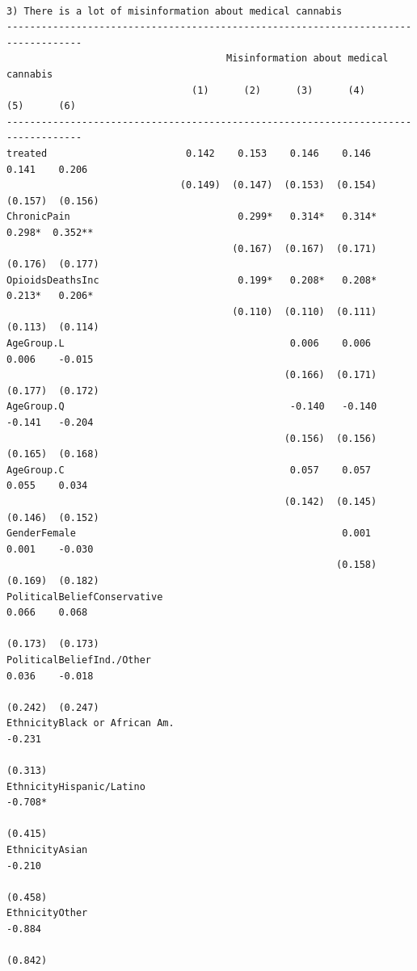 \documentclass[
]{article}
\begin{document}
\begin{verbatim}

3) There is a lot of misinformation about medical cannabis
-----------------------------------------------------------------------------------
                                      Misinformation about medical cannabis        
                                (1)      (2)      (3)      (4)      (5)      (6)   
-----------------------------------------------------------------------------------
treated                        0.142    0.153    0.146    0.146    0.141    0.206  
                              (0.149)  (0.147)  (0.153)  (0.154)  (0.157)  (0.156) 
ChronicPain                             0.299*   0.314*   0.314*   0.298*  0.352** 
                                       (0.167)  (0.167)  (0.171)  (0.176)  (0.177) 
OpioidsDeathsInc                        0.199*   0.208*   0.208*   0.213*   0.206* 
                                       (0.110)  (0.110)  (0.111)  (0.113)  (0.114) 
AgeGroup.L                                       0.006    0.006    0.006    -0.015 
                                                (0.166)  (0.171)  (0.177)  (0.172) 
AgeGroup.Q                                       -0.140   -0.140   -0.141   -0.204 
                                                (0.156)  (0.156)  (0.165)  (0.168) 
AgeGroup.C                                       0.057    0.057    0.055    0.034  
                                                (0.142)  (0.145)  (0.146)  (0.152) 
GenderFemale                                              0.001    0.001    -0.030 
                                                         (0.158)  (0.169)  (0.182) 
PoliticalBeliefConservative                                        0.066    0.068  
                                                                  (0.173)  (0.173) 
PoliticalBeliefInd./Other                                          0.036    -0.018 
                                                                  (0.242)  (0.247) 
EthnicityBlack or African Am.                                               -0.231 
                                                                           (0.313) 
EthnicityHispanic/Latino                                                   -0.708* 
                                                                           (0.415) 
EthnicityAsian                                                              -0.210 
                                                                           (0.458) 
EthnicityOther                                                              -0.884 
                                                                           (0.842) 

\end{verbatim}
\end{document}

